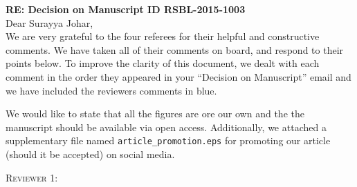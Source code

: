 \documentclass[12pt,letterpaper]{article}
\renewcommand{\section}[1]{%
\bigskip
\begin{center}
\begin{Large}
\normalfont\scshape #1
\medskip
\end{Large}
\end{center}}
\begin{document}
\textbf{RE: Decision on Manuscript ID RSBL-2015-1003}\\
\bigskip
Dear Surayya Johar,\\
\bigskip
We are very grateful to the four referees for their helpful and constructive comments.
We have taken all of their comments on board, and respond to their points below. To improve the clarity of this document, we dealt with each comment in the order they appeared in your ``Decision on Manuscript'' email and we have included the reviewers comments in blue.

We would like to state that all the figures are ore our own and the the manuscript should be available via open access.
Additionally, we attached a supplementary file named \texttt{article\_promotion.eps} for promoting our article (should it be accepted) on social media. 




\section{Reviewer 1:}
\end{document}
